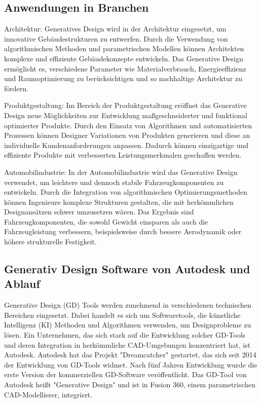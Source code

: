 \subsection*{Anwendungen in Branchen}
Architektur: Generatives Design wird in der Architektur eingesetzt, um innovative Gebäudestrukturen zu entwerfen. Durch die Verwendung von algorithmischen Methoden und parametrischen Modellen können Architekten komplexe und effiziente Gebäudekonzepte entwickeln. Das Generative Design ermöglicht es, verschiedene Parameter wie Materialverbrauch, Energieeffizienz und Raumoptimierung zu berücksichtigen und so nachhaltige Architektur zu fördern.

Produktgestaltung: Im Bereich der Produktgestaltung eröffnet das Generative Design neue Möglichkeiten zur Entwicklung maßgeschneiderter und funktional optimierter Produkte. Durch den Einsatz von Algorithmen und automatisierten Prozessen können Designer Variationen von Produkten generieren und diese an individuelle Kundenanforderungen anpassen. Dadurch können einzigartige und effiziente Produkte mit verbesserten Leistungsmerkmalen geschaffen werden.

Automobilindustrie: In der Automobilindustrie wird das Generative Design verwendet, um leichtere und dennoch stabile Fahrzeugkomponenten zu entwickeln. Durch die Integration von algorithmischen Optimierungsmethoden können Ingenieure komplexe Strukturen gestalten, die mit herkömmlichen Designansätzen schwer umzusetzen wären. Das Ergebnis sind Fahrzeugkomponenten, die sowohl Gewicht einsparen als auch die Fahrzeugleistung verbessern, beispielsweise durch bessere Aerodynamik oder höhere strukturelle Festigkeit.

\subsection*{Generativ Design Software von Autodesk und Ablauf}

Generative Design (GD) Tools werden zunehmend in verschiedenen technischen Bereichen eingesetzt. Dabei handelt es sich um Softwaretools, die künstliche Intelligenz (KI) Methoden und Algorithmen verwenden, um Designprobleme zu lösen. Ein Unternehmen, das sich stark auf die Entwicklung solcher GD-Tools und deren Integration in herkömmliche CAD-Umgebungen konzentriert hat, ist Autodesk. Autodesk hat das Projekt "Dreamcatcher" gestartet, das sich seit 2014 der Entwicklung von GD-Tools widmet. Nach fünf Jahren Entwicklung wurde die erste Version der kommerziellen GD-Software veröffentlicht. Das GD-Tool von Autodesk heißt "Generative Design" und ist in Fusion 360, einem parametrischen CAD-Modellierer, integriert. 

